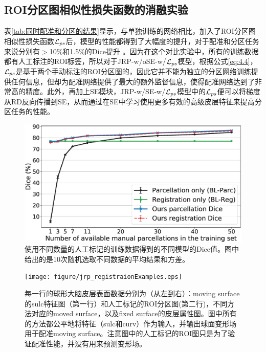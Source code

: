 \subsection{ROI分区图相似性损失函数的消融实验}
表\ref{tab:同时配准和分区的结果}显示，与单独训练的网络相比，加入了ROI分区图相似性损失函数${\cal L}_{ps}$后，模型的性能都得到了大幅度的提升，对于配准和分区任务来说分别有$>$10\%和1.5\%的Dice提升 。因为在这个对比实验中，所有的训练数据都有人工标注的ROI标签，所以对于JRP-w/oSE-w/${\cal L}_{ps}$模型，根据公式\ref{eq:4.4}，${\cal L}_{ps}$是基于两个手动标注的ROI分区图的，因此它并不能为独立的分区网络训练提供任何信息，但却为配准网络提供了最大的额外监督信息，使得配准网络达到了非常高的精度。此外，再加上SE模块，JRP-w/SE-w/${\cal L}_{ps}$模型中的${\cal L}_{ps}$便可以将梯度从RD反向传播到SE，从而通过在SE中学习使用更多有效的高级皮层特征来提高分区任务的性能。


\begin{figure}[t]
	\centering
	\includegraphics[width=0.7\linewidth]{figure/jrp_Figure_dice.eps}
	\caption{使用不同数量的人工标记的训练数据得到的不同模型的Dice值。图中给出的是10次随机选取不同数据的平均结果和方差。} \label{fig:jrp_dice}
\end{figure}

\begin{figure}[t]
	\centering
	\texttt{[image: figure/jrp\_registraionExamples.eps]}
	\caption{每一行的球形大脑皮层表面数据分别为（从左到右）：moving surface的sulc特征图（第一行）和人工标记的ROI分区图(第二行)，不同方法对应的moved surface，以及fixed surface的皮层属性图。图中所有的方法都公平地将特征（sulc和curv）作为输入，并输出球面变形场用于配准moving surface。注意图中的人工标记的ROI图只是为了验证配准性能，并没有用来预测变形场。} \label{fig:jrp_registraionExamples}
\end{figure}

